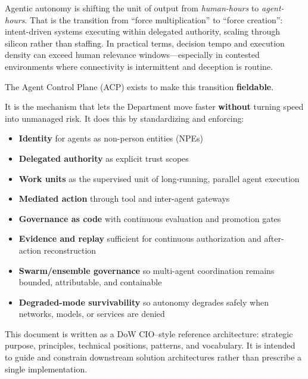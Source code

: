 \documentclass[11pt]{article}
\begin{document}
\makepapercover

{\small\renewcommand{\baselinestretch}{0.96}\selectfont\tableofcontents}
\newpage

\begin{execsummary}
Agentic autonomy is shifting the unit of output from \emph{human-hours} to \emph{agent-hours}. That is the transition from ``force multiplication'' to ``force creation'': intent-driven systems executing within delegated authority, scaling through silicon rather than staffing. In practical terms, decision tempo and execution density can exceed human relevance windows---especially in contested environments where connectivity is intermittent and deception is routine.

The Agent Control Plane (ACP) exists to make this transition \textbf{fieldable}.

It is the mechanism that lets the Department move faster \textbf{without} turning speed into unmanaged risk. It does this by standardizing and enforcing:

\begin{itemize}
\tightlist
\item \textbf{Identity} for agents as non-person entities (NPEs)
\item \textbf{Delegated authority} as explicit trust scopes
\item \textbf{Work units} as the supervised unit of long-running, parallel agent execution
\item \textbf{Mediated action} through tool and inter-agent gateways
\item \textbf{Governance as code} with continuous evaluation and promotion gates
\item \textbf{Evidence and replay} sufficient for continuous authorization and after-action reconstruction
\item \textbf{Swarm/ensemble governance} so multi-agent coordination remains bounded, attributable, and containable
\item \textbf{Degraded-mode survivability} so autonomy degrades safely when networks, models, or services are denied
\end{itemize}

This document is written as a DoW CIO--style reference architecture: strategic purpose, principles, technical positions, patterns, and vocabulary. It is intended to guide and constrain downstream solution architectures rather than prescribe a single implementation.
\end{execsummary}
\end{document}
